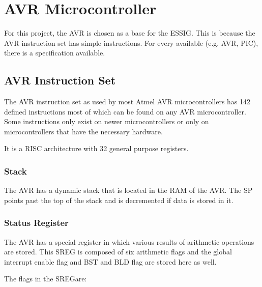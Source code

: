 \chapter{AVR Microcontroller}
For this project, the AVR \UC is chosen as a base for the \ac{ESSIG}. This
is because the AVR instruction set has simple instructions. For every \UC
available (e.g. AVR, PIC), there is a specification available.
 
%

\section{AVR Instruction Set}

The AVR instruction set\cite{atmelISA} as used by most Atmel AVR microcontrollers has 142 
defined instructions most of which can be found on any AVR microcontroller.
Some instructions only exist on newer microcontrollers or only on 
microcontrollers that have the necessary hardware.

It is a RISC architecture with 32 general purpose registers. 

\subsection{Stack}

The AVR has a dynamic stack that is located in the RAM of the AVR.
The \ac{SP} points past the top of the stack and is decremented if data is 
stored in it.

\subsection{Status Register}

The AVR has a special register\cite[p.1]{atmelISA} in which various results of arithmetic
operations are stored. This \ac{SREG} is composed of six arithmetic
flags and the global interrupt enable flag and BST and BLD flag are 
stored here as well.

The flags in the \ac{SREG}\cite[p.1]{atmelISA}\cite[p.9-10]{ATMegaDS}are:


